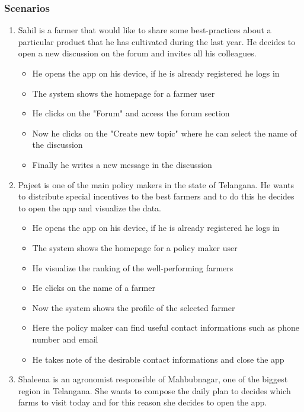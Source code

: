 \documentclass[table, 12pt]{article}
\begin{document}
\subsubsection{Scenarios}
\begin{enumerate}
    \item Sahil is a farmer that would like to share some best-practices about a particular product that he has cultivated during the last year.
    He decides to open a new discussion on the forum and invites all his colleagues.
    \begin{itemize}
        \item He opens the app on his device, if he is already registered he logs in
        \item The system shows the homepage for a farmer user
        \item He clicks on the "Forum" and access the forum section
        \item Now he clicks on the "Create new topic" where he can select the name of the discussion
        \item Finally he writes a new message in the discussion
    \end{itemize}
    \item Pajeet is one of the main policy makers in the state of Telangana.
    He wants to distribute special incentives to the best farmers and to do this he decides
    to open the app and visualize the data.
    \begin{itemize}
        \item He opens the app on his device, if he is already registered he logs in
        \item The system shows the homepage for a policy maker user
        \item He visualize the ranking of the well-performing farmers
        \item He clicks on the name of a farmer
        \item Now the system shows the profile of the selected farmer
        \item Here the policy maker can find useful contact informations such as phone number and email
        \item He takes note of the desirable contact informations and close the app
    \end{itemize}
    \item Shaleena is an agronomist responsible of Mahbubnagar, one of the biggest region in Telangana.
    She wants to compose the daily plan to decides which farms to visit today and for this reason she decides to open the app.

\end{enumerate}
\end{document}
